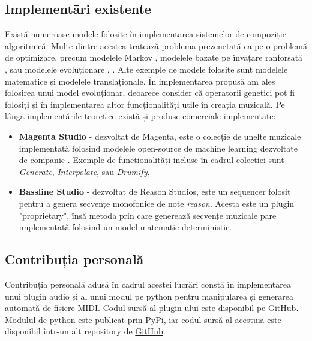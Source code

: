 \subsection{Implementāri existente}
\noindent Există numeroase modele folosite în implementarea sistemelor de compoziție algoritmică. Multe dintre acestea tratează problema prezenetată ca pe o problemă de optimizare, precum modelele Markov \cite{markov}, modelele bazate pe învățare ranforsată \cite{reinforced}, sau modelele evoluționare \cite{genetic_rc}, \cite{genetic_k}. Alte exemple de modele folosite sunt modelele matematice și modelele translaționale.  În implementarea propusă am ales folosirea unui model evoluționar, deoarece consider că operatorii genetici pot fi folosiți și în implementarea altor funcționalități utile în creația muzicală. Pe lânga implementările teoretice există și produse comerciale implementate: \par
\begin{itemize} 
    \item \textbf{Magenta Studio} - dezvoltat de Magenta, este o colecție de unelte muzicale implementată folosind modelele open-source de machine learning dezvoltate de companie \cite{magentastudio}. Exemple de funcționalități incluse în cadrul colecției sunt \textit{Generate}, \textit{Interpolate}, sau \textit{Drumify}. 
    \item \textbf{Bassline Studio} - \cite{website:reason} dezvoltat de Reason Studios, este un sequencer folosit pentru a genera secvențe monofonice de note \textit{reason}. Acesta este un plugin "proprietary", însă metoda prin care generează secvențe muzicale pare implementată folosind un model matematic deterministic.
\end{itemize}
    
\subsection{Contribuția personală}
    \noindent Contribuția personală adusă în cadrul acestei lucrări constă în implementarea unui plugin audio și al unui modul pe python pentru manipularea și generarea automată de fișiere MIDI. Codul sursă al plugin-ului este disponibil pe \href{https://github.com/speedypleath/b2bAI}{GitHub}. Modulul de python este publicat prin \href{https://pypi.org/project/midi-generator/}{PyPi}, iar codul sursă al acestuia este disponibil într-un alt repository de  \href{https://github.com/speedypleath/midi_generator}{GitHub}.